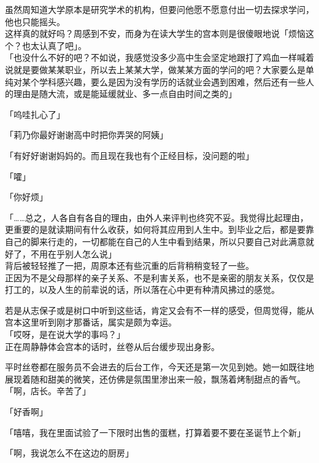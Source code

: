 虽然周知道大学原本是研究学术的机构，但要问他愿不愿意付出一切去探求学问，他也只能摇头。\\

这样真的就好吗？周感到不安，而身为在读大学生的宫本则是很傻眼地说「烦恼这个？也太认真了吧」。\\

「也没什么不好的吧？不如说，我感觉没多少高中生会坚定地跟打了鸡血一样喊着说就是要做某某职业，所以去上某某大学，做某某方面的学问的吧？大家要么是单纯对某个学科感兴趣，要么是因为没有学历的话就业会遇到困难，然后还有一些人的理由是随大流，或是能延缓就业、多一点自由时间之类的」

「呜哇扎心了」

「莉乃你最好谢谢高中时把你弄哭的阿姨」

「有好好谢谢妈妈的。而且现在我也有个正经目标，没问题的啦」

「嚯」

「你好烦」

「……总之，人各自有各自的理由，由外人来评判也终究不妥。我觉得比起理由，更重要的是就读期间有什么收获，如何将其应用到人生中。到毕业之后，都是要靠自己的脚来行走的，一切都能在自己的人生中看到结果，所以只要自己对此满意就好了，不用在乎别人怎么说」\\

背后被轻轻推了一把，周原本还有些沉重的后背稍稍变轻了一些。\\

正因为不是父母那样的亲子关系、不是利害关系，也不是亲密的朋友关系，仅仅是打工的，以及人生的前辈说的话，所以落在心中更有种清风拂过的感觉。

若是从志保子或是树口中听到这些话，肯定又会有不一样的感受，但周觉得，能从宫本这里听到刚才那番话，属实是颇为幸运。\\

「哎呀，是在说大学的事吗？」\\

正在周静静体会宫本的话时，丝卷从后台缓步现出身影。

平时丝卷都在服务员不会进去的后台工作，今天还是第一次见到她。她一如既往地展现着随和甜美的微笑，还仿佛是氛围里渗出来一般，飘荡着烤制甜点的香气。\\

「啊，店长。辛苦了」

「好香啊」

「嘻嘻，我在里面试验了一下限时出售的蛋糕，打算着要不要在圣诞节上个新」

「啊，我说怎么不在这边的厨房」\\

